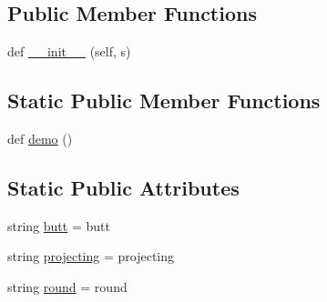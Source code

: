 \subsection*{Public Member Functions}
\begin{DoxyCompactItemize}
\item 
def \hyperlink{classmatplotlib_1_1__enums_1_1CapStyle_abba3aca97310565d9d5ae40e2d2a4986}{\+\_\+\+\_\+init\+\_\+\+\_\+} (self, s)
\end{DoxyCompactItemize}
\subsection*{Static Public Member Functions}
\begin{DoxyCompactItemize}
\item 
def \hyperlink{classmatplotlib_1_1__enums_1_1CapStyle_aaacf86f410d15a2474cd33eafc2d4b88}{demo} ()
\end{DoxyCompactItemize}
\subsection*{Static Public Attributes}
\begin{DoxyCompactItemize}
\item 
string \hyperlink{classmatplotlib_1_1__enums_1_1CapStyle_ae6e59d568540b12c5937c8a694b26ec0}{butt} = \textquotesingle{}butt\textquotesingle{}
\item 
string \hyperlink{classmatplotlib_1_1__enums_1_1CapStyle_a773407349bccf397d30d945dcb3e068e}{projecting} = \textquotesingle{}projecting\textquotesingle{}
\item 
string \hyperlink{classmatplotlib_1_1__enums_1_1CapStyle_af45ce87bc3be83f04d5985486de98fd6}{round} = \textquotesingle{}round\textquotesingle{}
\end{DoxyCompactItemize}



